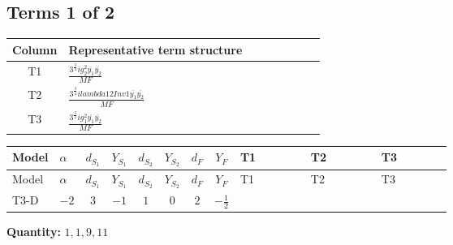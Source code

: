 \documentclass[8pt]{article}
\begin{document}
\begin{landscape}
\subsection*{Terms 1 of 2}
\begin{center}
\begin{tabular}{@{}c >{\raggedright\arraybackslash}p{0.82\linewidth}@{}}
\toprule
Column & Representative term structure \\
\midrule
T1 & \(\displaystyle \frac{3^{\frac{3}{4}} i g_{2}^{2} \overline{y_{1}} \overline{y_{2}}}{MF}\) \\
\midrule
T2 & \(\displaystyle \frac{3^{\frac{3}{4}} i lambda12Inv1 \overline{y_{1}} \overline{y_{2}}}{MF}\) \\
\midrule
T3 & \(\displaystyle \frac{3^{\frac{3}{4}} i g_{1}^{2} \overline{y_{1}} \overline{y_{2}}}{MF}\) \\
\midrule
\bottomrule
\end{tabular}
\end{center}
\smallskip
\tiny
\begin{longtable}{@{}llcccccc >{\raggedright\arraybackslash}p{0.21\linewidth} >{\raggedright\arraybackslash}p{0.21\linewidth} >{\raggedright\arraybackslash}p{0.21\linewidth}@{}}
\toprule
Model & $\alpha$ & $d_{S_1}$ & $Y_{S_1}$ & $d_{S_2}$ & $Y_{S_2}$ & $d_F$ & $Y_F$ & T1 & T2 & T3 \\
\midrule
\endfirsthead
\toprule
Model & $\alpha$ & $d_{S_1}$ & $Y_{S_1}$ & $d_{S_2}$ & $Y_{S_2}$ & $d_F$ & $Y_F$ & T1 & T2 & T3 \\
\midrule
\endhead
T3-D & $-2$ & $3$ & $-1$ & $1$ & $0$ & $2$ & $-\frac{1}{2}$ & \scriptsize\adjustbox{max width=\linewidth}{$\begin{gathered} - \frac{11 \cdot 3^{\frac{3}{4}} i g_{2}^{2} \overline{y_{1}} \overline{y_{2}}}{8 MF}\end{gathered}$} & \scriptsize\adjustbox{max width=\linewidth}{$\begin{gathered} - \frac{3^{\frac{3}{4}} i lambda12Inv1 \overline{y_{1}} \overline{y_{2}}}{6 MF}\end{gathered}$} & \scriptsize\adjustbox{max width=\linewidth}{$\begin{gathered} - \frac{3^{\frac{3}{4}} i g_{1}^{2} \overline{y_{1}} \overline{y_{2}}}{8 MF}\end{gathered}$} \\
\midrule
\bottomrule
\end{longtable}
\clearpage
\noindent\textbf{Quantity: }$\mathrm{1,1,9,11}$\par\smallskip

\end{landscape}
\end{document}
